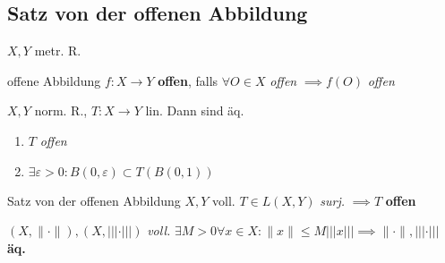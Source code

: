 \subsection{Satz von der offenen Abbildung}
$X,Y$ metr. R.

\begin{definition}{offene Abbildung}
  $f:X\to Y$ \textbf{offen}, falls $\forall O \in X$ \textit{offen}
  $\implies f(O)$ \textit{offen}
\end{definition}

\begin{lemma}
  $X,Y$ norm. R., $T:X \to Y$ lin. Dann sind äq.
  \begin{enumerate}[label = (\roman*)]
    \item $T$ \textit{offen}
    \item $\exists \varepsilon > 0 : B(0,\varepsilon) \subset T(B(0,1))$
  \end{enumerate}
\end{lemma}

\begin{satz}{Satz von der offenen Abbildung}
  $X,Y$ voll. $T \in L(X,Y)$ \textit{surj.} $\implies T$ \textbf{offen}
\end{satz}

\begin{korrolar}
  $(X,\|\cdot\|),(X,|||\cdot|||)$ \textit{voll.}
  $\exists M > 0 \forall x\in X: \|x\| \leq M |||x|||
  \implies \|\cdot\|,|||\cdot|||$ \textbf{äq.}
\end{korrolar}
